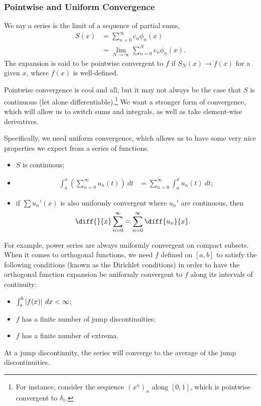 \documentclass[10pt]{mypackage}
\begin{document}
\subsubsection{Pointwise and Uniform Convergence}%
We say a series is the limit of a sequence of partial sums,
\begin{align*}
  S\left(x\right) &= \sum_{n=0}^{\infty}c_n\phi_n(x)\\
                  &= \lim_{N\rightarrow\infty}\sum_{n=0}^{N}c_n\phi_n(x).
\end{align*}
The expansion is said to be pointwise convergent to $f$ if $S_N(x)\rightarrow f(x)$ for a given $x$, where $f(x)$ is well-defined.\newline

Pointwise convergence is cool and all, but it may not always be the case that $S$ is continuous (let alone differentiable).\footnote{For instance, consider the sequence $\left(x^n\right)_{n}$ along $\left[0,1\right]$, which is pointwise convergent to $\delta_1$.} We want a stronger form of convergence, which will allow us to switch sums and integrals, as well as take element-wise derivatives.\newline

Specifically, we need uniform convergence, which allows us to have some very nice properties we expect from a series of functions.
\begin{itemize}
  \item $S$ is continuous;
  \item 
    \begin{align*}
      \int_{a}^{x} \left(\sum_{n=0}^{\infty}u_n(t)\right)\:dt &= \sum_{n=0}^{\infty}\int_{a}^{x} u_n(t)\:dt;
    \end{align*}
  \item if $\sum u_n'(x)$ is also uniformly convergent where $u_n'$ are continuous, then
    \begin{align*}
      \diff{}{x}\sum_{n=0}^{\infty} &= \sum_{n=0}^{\infty}\diff{u_n}{x}.
    \end{align*}
\end{itemize}
For example, power series are always uniformly convergent on compact subsets. When it comes to orthogonal functions, we need $f$ defined on $[a,b]$ to satisfy the following conditions (known as the Dirichlet conditions) in order to have the orthogonal function expansion be uniformly convergent to $f$ along its intervals of continuity:
\begin{itemize}
  \item $\int_{a}^{b} \left\vert f(x) \right\vert\:dx < \infty \displaystyle$;
  \item $f$ has a finite number of jump discontinuities;
  \item $f$ has a finite number of extrema.
\end{itemize}
At a jump discontinuity, the series will converge to the average of the jump discontinuities.\newline
\end{document}
